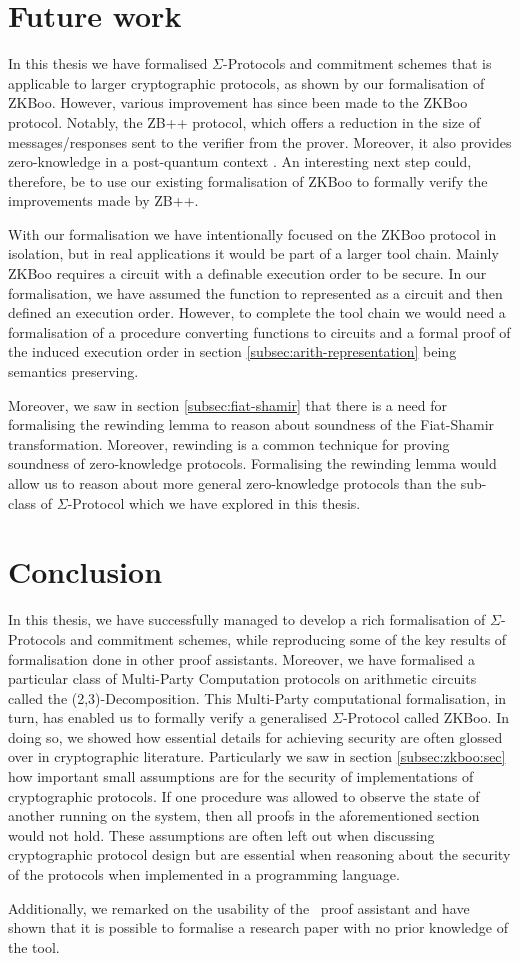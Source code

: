 \section{Future work}
\label{sec:future_work}
In this thesis we have formalised $\Sigma$-Protocols and
commitment schemes that is applicable to larger cryptographic protocols, as shown
by our formalisation of ZKBoo. However, various improvement has since been made to the
ZKBoo protocol. Notably, the ZB++ protocol, which offers a reduction in the
size of messages/responses sent to the verifier from the prover. Moreover, it also provides zero-knowledge
in a post-quantum context \cite{zkb++}. An interesting next step could,
therefore, be to use our existing formalisation of ZKBoo to formally verify the
improvements made by ZB++.

With our formalisation we have intentionally focused on the ZKBoo protocol in
isolation, but in real applications it would be part of a larger tool chain.
Mainly ZKBoo requires a circuit with a definable execution order to be secure.
In our formalisation, we have assumed the function to represented as a circuit
and then defined an execution order. However, to complete the tool chain we would need a formalisation of
a procedure converting functions to circuits and a formal proof of the induced
execution order in section \ref{subsec:arith-representation} being semantics preserving.

Moreover, we saw in section \ref{subsec:fiat-shamir} that there is a need for
formalising the rewinding lemma to reason about soundness of the Fiat-Shamir
transformation. Moreover, rewinding is a common technique for proving soundness
of zero-knowledge protocols. Formalising the rewinding lemma would allow
us to reason about more general zero-knowledge protocols than the sub-class of
$\Sigma$-Protocol which we have explored in this thesis.

\section{Conclusion}
\label{sec:conclusion}
In this thesis, we have successfully managed to develop a rich formalisation of
$\Sigma$-Protocols and commitment schemes, while reproducing some of the key
results of formalisation done in other proof assistants.
Moreover, we have formalised a particular class of Multi-Party Computation
protocols on arithmetic circuits called the (2,3)-Decomposition.
This Multi-Party computational formalisation, in turn, has enabled us to formally
verify a generalised $\Sigma$-Protocol called ZKBoo.
In doing so, we showed how essential details for achieving security are
often glossed over in cryptographic literature.
Particularly we saw in section \ref{subsec:zkboo:sec} how important small
assumptions are for the security of implementations of cryptographic protocols.
If one procedure was allowed to observe the state of another running on the
system, then all proofs in the aforementioned section would not hold. These
assumptions are often left out when discussing cryptographic protocol design
but are essential when reasoning about the security of the protocols when
implemented in a programming language.

Additionally, we remarked on the usability of the \easycrypt\ proof
assistant and have shown that it is possible to formalise a research paper with
no prior knowledge of the tool.

